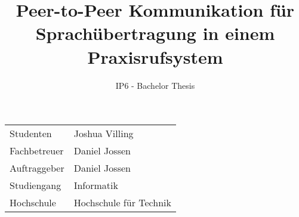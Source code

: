 \documentclass[final]{fhnwreport}
\title{Peer-to-Peer Kommunikation für Sprachübertragung in einem Praxisrufsystem}  %
\author{IP6 - Bachelor Thesis}                      %
\begin{document}
    \maketitle

    \vspace*{\fill}

    \begin{center}
        \renewcommand\arraystretch{2}
        \begin{tabular}{l l}
            Studenten & Joshua Villing \\
            Fachbetreuer & Daniel Jossen\\
            Auftraggeber & Daniel Jossen\\
            Studiengang & Informatik\\
            Hochschule & Hochschule für Technik
        \end{tabular}
    \end{center}

    \clearpage


    


    \setcounter{tocdepth}{2}
    \tableofcontents
    \clearpage

    
    
    
    
    
    
    
    
    


    
\end{document}
